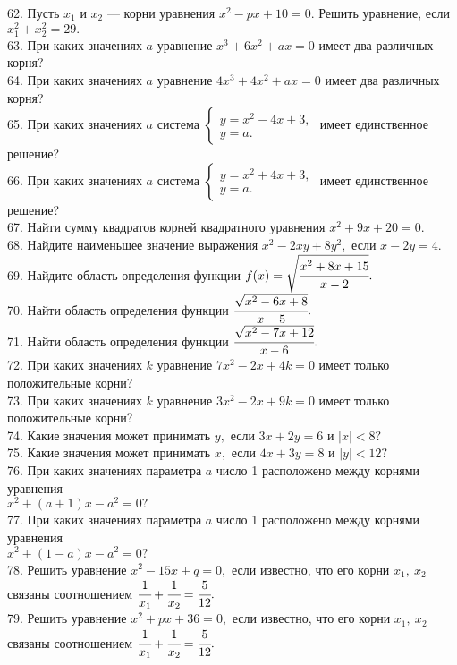 62. Пусть $x_1$ и $x_2$ --- корни уравнения $x^2-px+10=0.$ Решить уравнение, если $x_1^2+x_2^2=29.$\\
63. При каких значениях $a$ уравнение $x^3+6x^2+ax=0$ имеет два различных корня?\\
64. При каких значениях $a$ уравнение $4x^3+4x^2+ax=0$ имеет два различных корня?\\
65. При каких значениях $a$ система $\begin{cases} y=x^2-4x+3,\\ y=a.\end{cases}$ имеет единственное решение?\\
66. При каких значениях $a$ система $\begin{cases} y=x^2+4x+3,\\ y=a.\end{cases}$ имеет единственное решение?\\
67. Найти сумму квадратов корней квадратного уравнения $x^2+9x+20=0.$\\
68. Найдите наименьшее значение выражения $x^2-2xy+8y^2,$ если $x-2y=4.$\\
69. Найдите область определения функции $f(x)=\sqrt{\cfrac{x^2+8x+15}{x-2}}.$\\
70. Найти область определения функции $\cfrac{\sqrt{x^2-6x+8}}{x-5}.$\\
71. Найти область определения функции $\cfrac{\sqrt{x^2-7x+12}}{x-6}.$\\
72. При каких значениях $k$ уравнение $7x^2-2x+4k=0$ имеет только положительные корни?\\
73. При каких значениях $k$ уравнение $3x^2-2x+9k=0$ имеет только положительные корни?\\
74. Какие значения может принимать $y,$ если $3x+2y=6$ и $|x|<8?$\\
75. Какие значения может принимать $x,$ если $4x+3y=8$ и $|y|<12?$\\
76. При каких значениях параметра $a$ число 1 расположено между корнями уравнения \\$x^2+(a+1)x-a^2=0?$\\
77. При каких значениях параметра $a$ число 1 расположено между корнями уравнения \\$x^2+(1-a)x-a^2=0?$\\
78. Решить уравнение $x^2-15x+q=0,$ если известно, что его корни $x_1,\ x_2$ связаны соотношением $\cfrac{1}{x_1}+\cfrac{1}{x_2}=\cfrac{5}{12}.$\\
79. Решить уравнение $x^2+px+36=0,$ если известно, что его корни $x_1,\ x_2$ связаны соотношением $\cfrac{1}{x_1}+\cfrac{1}{x_2}=\cfrac{5}{12}.$\\
